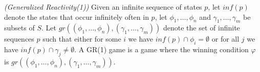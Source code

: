 \begin{definition}\label{def:generalized-reactivity}\emph{(Generalized Reactivity(1))}
Given an infinite sequence of states $p$, let $inf(p)$ denote the states that occur infinitely often in $p$, let $\phi_1,\ldots,\phi_n$ and $\gamma_1,\ldots,\gamma_m$ be subsets of $S$.  Let $gr((\phi_1,\ldots,\phi_n),(\gamma_1,\ldots,\gamma_m))$ denote the set of infinite sequences $p$ such that either for some $i$ we have $inf(p) \cap \phi_i = \emptyset$ or for all $j$ we have $inf(p)\cap \gamma_j \neq \emptyset$. A GR(1) game is a game where the winning condition $\varphi$ is $gr((\phi_1,\ldots,\phi_n),(\gamma_1,\ldots,\gamma_m))$.
\end{definition}


%

